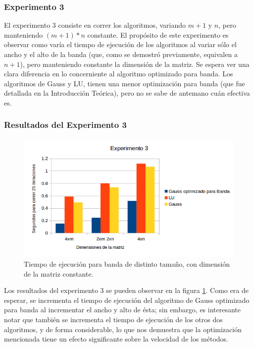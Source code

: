 \FloatBarrier

\subsubsection{Experimento 3}
\par El experimento 3 consiste en correr los algoritmos, variando $m+1$ y $n$, pero manteniendo $(m+1)*n$ constante.
El prop\'osito de este experimento es observar como var\'ia el tiempo de ejecuci\'on de los algoritmos al variar s\'olo el ancho y el alto de la banda (que, como se demostr\'o previamente, equivalen a $n+1$), pero manteniendo constante la dimensi\'on de la matriz.
Se espera ver una clara diferencia en lo concerniente al algoritmo optimizado para banda. Los algoritmos de Gauss y LU, tienen una menor optimizaci\'on para banda (que fue detallada en la Introducci\'on Te\'orica), pero no se sabe de antemano cu\'an efectiva es.

\FloatBarrier

\subsubsection{Resultados del Experimento 3}

\begin{figure}[ht]
\begin{center}
\includegraphics[width=0.8\columnwidth]{../src/experimentos/exp1-3/exp3figura}
\caption{Tiempo de ejecuci\'on para banda de distinto tama\~no, con dimensi\'on de la matriz constante.}
\label{fig:figura4}
\end{center}
\end{figure}

\par Los resultados del experimento 3 se pueden observar en la figura \ref{fig:figura4}. Como era de esperar, se incrementa el tiempo de ejecuci\'on del algoritmo de Gauss optimizado para banda al incrementar el ancho y alto de \'esta; sin embargo, es interesante notar que tambi\'en se incrementa el tiempo de ejecuci\'on de los otros dos algoritmos, y de forma considerable, lo que nos demuestra que la optimizaci\'on mencionada tiene un efecto significante sobre la velocidad de los m\'etodos.
\FloatBarrier


